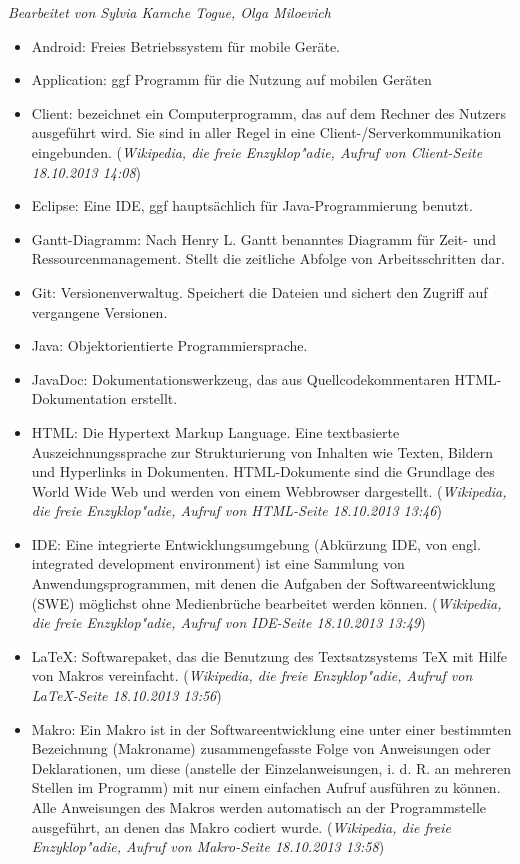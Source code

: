 \textit{Bearbeitet von Sylvia Kamche Togue, Olga Miloevich}
		
\begin{itemize}
\item Android: Freies Betriebssystem für mobile Geräte.
\item Application: ggf Programm für die Nutzung auf mobilen Geräten
\item Client: bezeichnet ein Computerprogramm, das auf dem Rechner des Nutzers ausgeführt wird. Sie sind in aller Regel in eine Client-/Serverkommunikation eingebunden. (\textit{Wikipedia, die freie Enzyklop"adie, Aufruf von Client-Seite 18.10.2013 14:08})
\item Eclipse: Eine IDE, ggf hauptsächlich für Java-Programmierung benutzt.
\item Gantt-Diagramm: Nach Henry L. Gantt benanntes Diagramm für Zeit- und Ressourcenmanagement. Stellt die zeitliche Abfolge von Arbeitsschritten dar.
\item Git: Versionenverwaltug. Speichert die Dateien und sichert den Zugriff auf vergangene Versionen.
\item Java: Objektorientierte Programmiersprache.
\item JavaDoc: Dokumentationswerkzeug, das aus Quellcodekommentaren HTML-Dokumentation erstellt.
\item HTML: Die Hypertext Markup Language. Eine textbasierte Auszeichnungssprache zur Strukturierung von Inhalten wie Texten, Bildern und Hyperlinks in Dokumenten. HTML-Dokumente sind die Grundlage des World Wide Web und werden von einem Webbrowser dargestellt. (\textit{Wikipedia, die freie Enzyklop"adie, Aufruf von HTML-Seite 18.10.2013 13:46})
\item IDE: Eine integrierte Entwicklungsumgebung (Abkürzung IDE, von engl. integrated development environment) ist eine Sammlung von Anwendungsprogrammen, mit denen die Aufgaben der Softwareentwicklung (SWE) möglichst ohne Medienbrüche bearbeitet werden können.
(\textit{Wikipedia, die freie Enzyklop"adie, Aufruf von IDE-Seite 18.10.2013 13:49})
\item LaTeX: Softwarepaket, das die Benutzung des Textsatzsystems TeX mit Hilfe von Makros vereinfacht. (\textit{Wikipedia, die freie Enzyklop"adie, Aufruf von LaTeX-Seite 18.10.2013 13:56}) 
\item Makro: Ein Makro ist in der Softwareentwicklung eine unter einer bestimmten Bezeichnung (Makroname) zusammengefasste Folge von Anweisungen oder Deklarationen, um diese (anstelle der Einzelanweisungen, i. d. R. an mehreren Stellen im Programm) mit nur einem einfachen Aufruf ausführen zu können. Alle Anweisungen des Makros werden automatisch an der Programmstelle ausgeführt, an denen das Makro codiert wurde. (\textit{Wikipedia, die freie Enzyklop"adie, Aufruf von Makro-Seite 18.10.2013 13:58})

\end{itemize}
